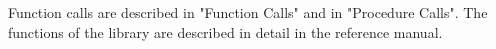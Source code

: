 Function  calls are described   in   "Function Calls" and in   "Procedure
Calls".  The functions of the {\GAP}  library are  described in detail in
the reference manual.

